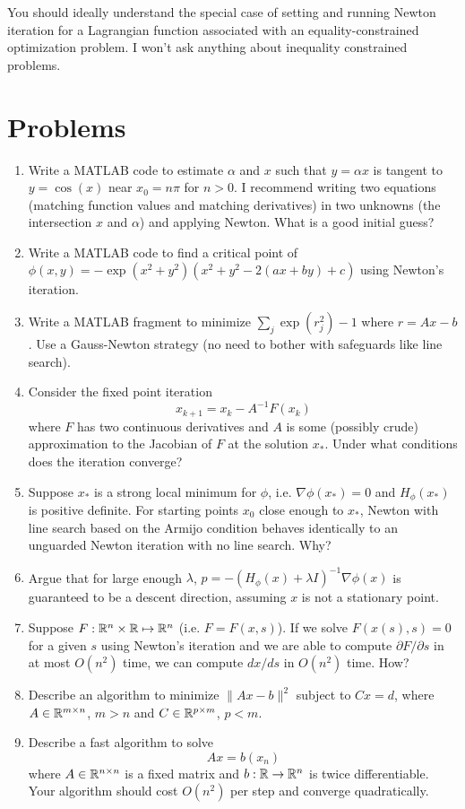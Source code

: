 \documentclass[12pt, leqno]{article}
\begin{document}
You should ideally understand the special case of setting and running
Newton iteration for a Lagrangian function associated with an
equality-constrained optimization problem.  I won't ask anything
about inequality constrained problems.

\section{Problems}

\begin{enumerate}
\item
  Write a MATLAB code to estimate $\alpha$ and $x$ such that
  $y = \alpha x$ is tangent to $y = \cos(x)$ near $x_0 = n \pi$
  for $n > 0$.  I recommend writing two equations (matching function
  values and matching derivatives) in two unknowns (the intersection
  $x$ and $\alpha$) and applying Newton.  What is a good initial guess?
\item
  Write a MATLAB code to find a critical point of
  $\phi(x,y) = -\exp(x^2+y^2) (x^2 + y^2 - 2(ax + by) + c)$
  using Newton's iteration.
\item
  Write a MATLAB fragment to minimize $\sum_j \exp(r_j^2)-1$ where
  $r = Ax-b$.  Use a Gauss-Newton strategy (no need to bother
  with safeguards like line search).
\item
  Consider the fixed point iteration
  \[
    x_{k+1} = x_k - A^{-1} F(x_k)
  \]
  where $F$ has two continuous derivatives and $A$ is some (possibly
  crude) approximation to the Jacobian of $F$ at the solution $x_*$.
  Under what conditions does the iteration converge?
\item
  Suppose $x_*$ is a strong local minimum for $\phi$, i.e. $\nabla
  \phi(x_*) = 0$ and $H_\phi(x_*)$ is positive definite.  For starting
  points $x_0$ close enough to $x_*$, Newton with line search based
  on the Armijo condition behaves identically to an unguarded
  Newton iteration with no line search.  Why?
\item
  Argue that for large enough $\lambda$,
  $p = -(H_{\phi}(x) + \lambda I)^{-1} \nabla \phi(x)$ is guaranteed
  to be a descent direction, assuming $x$ is not a stationary point.
\item
  Suppose $F : \mathbb{R}^n \times \mathbb{R} \mapsto \mathbb{R}^n$ (i.e. $F = F(x,s)$).
  If we solve $F(x(s), s) = 0$ for a given $s$ using Newton's
  iteration and we are able to compute $\partial F/\partial s$
  in at most $O(n^2)$ time, we can compute $dx/ds$ in $O(n^2)$ time.
  How?
\item
  Describe an algorithm to minimize $\|Ax-b\|^2$ subject to $Cx = d$,
  where $A \in \mathbb{R}^{m \times n}$, $m > n$ and $C \in \mathbb{R}^{p \times m}$,
  $p < m$.
\item
  Describe a fast algorithm to solve
  \[
    Ax = b(x_n)
  \]
  where $A \in \mathbb{R}^{n \times n}$ is a fixed matrix and
  $b : \mathbb{R} \rightarrow \mathbb{R}^n$ is twice differentiable.
  Your algorithm should cost $O(n^2)$ per step and converge quadratically.
\end{enumerate}
\end{document}

